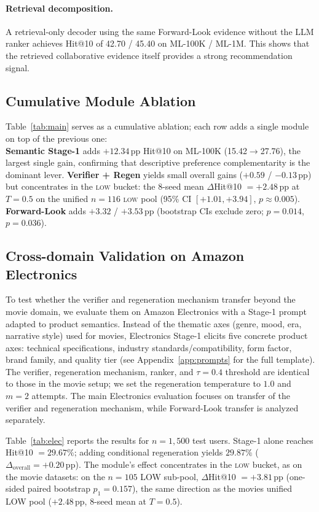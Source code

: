 \documentclass[11pt]{article}
\begin{document}
\paragraph{Retrieval decomposition.}
A retrieval-only decoder using the same Forward-Look evidence without the LLM ranker achieves Hit@10 of 42.70 / 45.40 on ML-100K / ML-1M. This shows that the retrieved collaborative evidence itself provides a strong recommendation signal.

\subsection{Cumulative Module Ablation}
\label{sec:ablation}

Table~\ref{tab:main} serves as a cumulative ablation; each row adds a single module on top of the previous one: \\ \textbf{Semantic Stage-1} adds $+12.34$\,pp Hit@10 on ML-100K (15.42$\to$27.76), the largest single gain, confirming that descriptive preference complementarity is the dominant lever. \textbf{Verifier + Regen} yields small overall gains ($+0.59$ / $-0.13$\,pp) but concentrates in the \textsc{low} bucket: the 8-seed mean $\Delta$Hit@10 $=+2.48$\,pp at $T{=}0.5$ on the unified $n{=}116$ \textsc{low} pool (95\% CI $[+1.01, +3.94]$, $p{\approx}0.005$).
\textbf{Forward-Look} adds $+3.32$ / $+3.53$\,pp (bootstrap CIs 
exclude zero; $p{=}0.014$, $p{=}0.036$).

\subsection{Cross-domain Validation on Amazon Electronics}
\label{sec:elec}
To test whether the verifier and regeneration mechanism transfer beyond the movie domain, we evaluate them on Amazon Electronics with a Stage-1 prompt adapted to product semantics. Instead of the thematic axes (genre, mood, era, narrative style) used for movies, Electronics Stage-1 elicits five concrete product axes: technical specifications, industry standards/compatibility, form factor, brand family, and quality tier (see Appendix~\ref{app:prompts} for the full template). The verifier, regeneration mechanism, ranker, and $\tau{=}0.4$ threshold are identical to those in the movie setup; we set the regeneration temperature to $1.0$ and $m{=}2$ attempts. The main Electronics evaluation focuses on transfer of the verifier and regeneration mechanism, while Forward-Look transfer is analyzed separately.

Table~\ref{tab:elec} reports the results for $n{=}1{,}500$ test users. Stage-1 alone reaches Hit@10 $=29.67\%$; adding conditional regeneration yields $29.87\%$ ($\Delta_{\text{overall}}{=}+0.20$\,pp). The module's effect concentrates in the \textsc{low} bucket, as on the movie datasets: on the $n{=}105$ LOW sub-pool, $\Delta$Hit@10 $=+3.81$\,pp (one-sided paired bootstrap $p_1{=}0.157$), the same direction as the movies unified LOW pool ($+2.48$\,pp, 8-seed mean at $T{=}0.5$).
\end{document}
